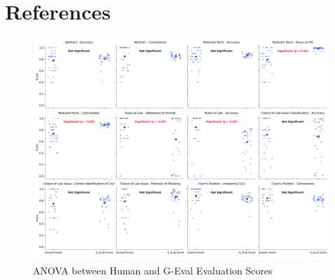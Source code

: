 \documentclass[a4paper,12pt]{article}
\begin{document}
\section*{References}
\printbibliography[heading=empty]

\newpage

\begin{figure}[htp]
\centering
\includegraphics[width=14cm]{metric_anova_comparison.png}
\caption{ANOVA between Human and G-Eval Evaluation Scores}
\label{fig:image}
\end{figure}
\end{document}
